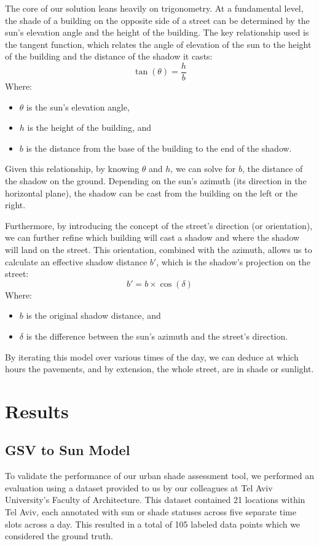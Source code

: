 \documentclass[nohyperref]{article}
\theoremstyle{plain}
\theoremstyle{definition}
\theoremstyle{remark}
\begin{document}
The core of our solution leans heavily on trigonometry. At a fundamental level, the shade of a building on the opposite side of a street can be determined by the sun's elevation angle and the height of the building. The key relationship used is the tangent function, which relates the angle of elevation of the sun to the height of the building and the distance of the shadow it casts:
\[
\tan(\theta) = \frac{h}{b}
\]
Where:
\begin{itemize}
    \item \(\theta\) is the sun's elevation angle,
    \item \(h\) is the height of the building, and
    \item \(b\) is the distance from the base of the building to the end of the shadow.
\end{itemize}

Given this relationship, by knowing \(\theta\) and \(h\), we can solve for \(b\), the distance of the shadow on the ground. Depending on the sun's azimuth (its direction in the horizontal plane), the shadow can be cast from the building on the left or the right. 

Furthermore, by introducing the concept of the street's direction (or orientation), we can further refine which building will cast a shadow and where the shadow will land on the street. This orientation, combined with the azimuth, allows us to calculate an effective shadow distance \(b'\), which is the shadow's projection on the street:
\[
b' = b \times \cos(\delta)
\]
Where:
\begin{itemize}
    \item \(b\) is the original shadow distance, and
    \item \(\delta\) is the difference between the sun's azimuth and the street's direction.
\end{itemize}

By iterating this model over various times of the day, we can deduce at which hours the pavements, and by extension, the whole street, are in shade or sunlight.

\section{Results}
\label{results}
\subsection{GSV to Sun Model}

To validate the performance of our urban shade assessment tool, we performed an evaluation using a dataset provided to us by our colleagues at Tel Aviv University's Faculty of Architecture. This dataset contained 21  locations within Tel Aviv, each annotated with sun or shade statuses across five separate time slots across a day. This resulted in a total of 105 labeled data points which we considered the ground truth.
\end{document}
